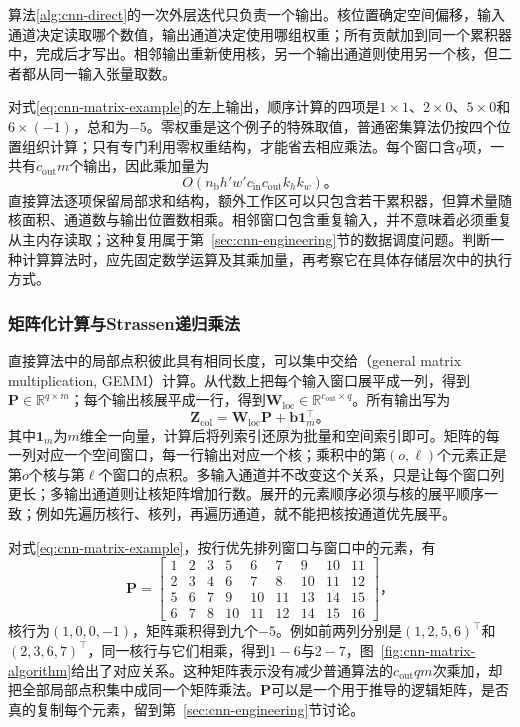 算法\ref{alg:cnn-direct}的一次外层迭代只负责一个输出。核位置确定空间偏移，输入通道决定读取哪个数值，输出通道决定使用哪组权重；所有贡献加到同一个累积器中，完成后才写出。相邻输出重新使用核，另一个输出通道则使用另一个核，但二者都从同一输入张量取数。

对式\eqref{eq:cnn-matrix-example}的左上输出，顺序计算的四项是$1\times1$、$2\times0$、$5\times0$和$6\times(-1)$，总和为$-5$。零权重是这个例子的特殊取值，普通密集算法仍按四个位置组织计算；只有专门利用零权重结构，才能省去相应乘法。每个窗口含$q$项，一共有$c_{\mathrm{out}}m$个输出，因此乘加量为
\begin{equation}
  O\!\left(n_{\mathrm b}h'w'c_{\mathrm{in}}c_{\mathrm{out}}k_hk_w\right)\text{。}
  \label{eq:cnn-direct-cost}
\end{equation}
直接算法逐项保留局部求和结构，额外工作区可以只包含若干累积器，但算术量随核面积、通道数与输出位置数相乘。相邻窗口包含重复输入，并不意味着必须重复从主内存读取；这种复用属于第~\ref{sec:cnn-engineering}节的数据调度问题。判断一种计算算法时，应先固定数学运算及其乘加量，再考察它在具体存储层次中的执行方式。

\subsubsection{矩阵化计算与Strassen递归乘法}
\label{sec:cnn-matrix-algorithm}

直接算法中的局部点积彼此具有相同长度，可以集中交给（general matrix multiplication, GEMM）计算。从代数上把每个输入窗口展平成一列，得到$\bm P\in\mathbb R^{q\times m}$；每个输出核展平成一行，得到$\bm W_{\mathrm{loc}}\in\mathbb R^{c_{\mathrm{out}}\times q}$。所有输出写为
\begin{equation}
  \bm Z_{\mathrm{col}}=\bm W_{\mathrm{loc}}\bm P+\bm b\bm1_m^\top\text{。}
  \label{eq:cnn-im2col}
\end{equation}
其中$\bm1_m$为$m$维全一向量，计算后将列索引还原为批量和空间索引即可。矩阵的每一列对应一个空间窗口，每一行输出对应一个核；乘积中的第$(o,\ell)$个元素正是第$o$个核与第$\ell$个窗口的点积。多输入通道并不改变这个关系，只是让每个窗口列更长；多输出通道则让核矩阵增加行数。展开的元素顺序必须与核的展平顺序一致；例如先遍历核行、核列，再遍历通道，就不能把核按通道优先展平。

对式\eqref{eq:cnn-matrix-example}，按行优先排列窗口与窗口中的元素，有
\begin{equation}
  \bm P=\begin{bmatrix}
    1&2&3&5&6&7&9&10&11\\
    2&3&4&6&7&8&10&11&12\\
    5&6&7&9&10&11&13&14&15\\
    6&7&8&10&11&12&14&15&16
  \end{bmatrix}\text{，}
  \label{eq:cnn-im2col-example}
\end{equation}
核行为$(1,0,0,-1)$，矩阵乘积得到九个$-5$。例如前两列分别是$(1,2,5,6)^\top$和$(2,3,6,7)^\top$，同一核行与它们相乘，得到$1-6$与$2-7$，图~\ref{fig:cnn-matrix-algorithm}给出了对应关系。这种矩阵表示没有减少普通算法的$c_{\mathrm{out}}qm$次乘加，却把全部局部点积集中成同一个矩阵乘法。$\bm P$可以是一个用于推导的逻辑矩阵，是否真的复制每个元素，留到第~\ref{sec:cnn-engineering}节讨论。


